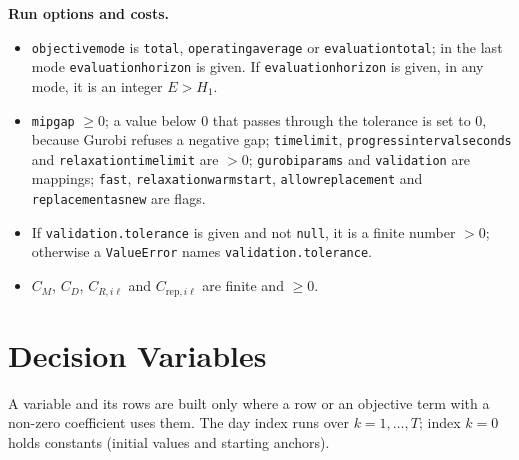 \documentclass[11pt,a4paper]{article}
\theoremstyle{plain}
\theoremstyle{definition}
\renewcommand{\_}{\textunderscore\allowbreak{}}
\begin{document}
\textbf{Run options and costs.}
\begin{itemize}[leftmargin=1.5em]
  \item \texttt{objective\_mode} is \texttt{total}, \texttt{operating\_average} or \texttt{evaluation\_total}; in the last mode \texttt{evaluation\_horizon} is given. If \texttt{evaluation\_horizon} is given, in any mode, it is an integer $E > H_1$.
  \item \texttt{mip\_gap} $\ge 0$; a value below $0$ that passes through the tolerance is set to $0$, because Gurobi refuses a negative gap; \texttt{time\_limit}, \texttt{progress\_interval\_seconds} and \texttt{relaxation\_time\_limit} are $> 0$; \texttt{gurobi\_params} and \texttt{validation} are mappings; \texttt{fast}, \texttt{relaxation\_warm\_start}, \texttt{allow\_replacement} and \texttt{replacement\_as\_new} are flags.
  \item If \texttt{validation.tolerance} is given and not \texttt{null}, it is a finite number $> 0$; otherwise a \texttt{ValueError} names \texttt{validation.tolerance}.
  \item $C_M$, $C_D$, $C_{R,i\ell}$ and $C_{\mathrm{rep},i\ell}$ are finite and $\ge 0$.
\end{itemize}

\section{Decision Variables}
\label{sec:variables}

A variable and its rows are built only where a row or an objective term with a
non-zero coefficient uses them. The day index runs over $k = 1, \ldots, T$; index
$k = 0$ holds constants (initial values and starting anchors).
\end{document}
